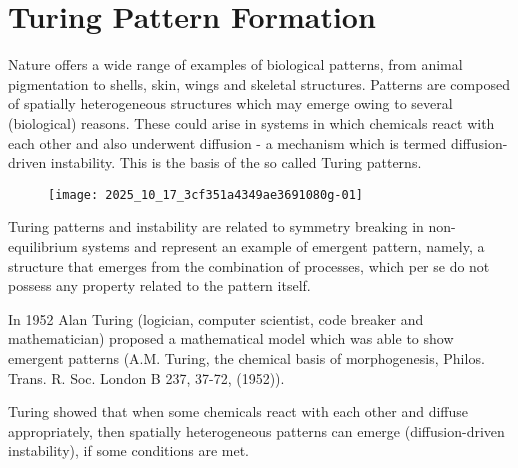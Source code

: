 
\section{Turing Pattern Formation}
Nature offers a wide range of examples of biological patterns, from animal pigmentation to shells, skin, wings and skeletal structures. Patterns are composed of spatially heterogeneous structures which may emerge owing to several (biological) reasons. These could arise in systems in which chemicals react with each other and also underwent diffusion - a mechanism which is termed diffusion-driven instability. This is the basis of the so called Turing patterns.
\begin{figure}[H]
    \centering
    \texttt{[image: 2025\_10\_17\_3cf351a4349ae3691080g-01]}
\end{figure}

Turing patterns and instability are related to symmetry breaking in non-equilibrium systems and represent an example of emergent pattern, namely, a structure that emerges from the combination of processes, which per se do not possess any property related to the pattern itself.

In 1952 Alan Turing (logician, computer scientist, code breaker and mathematician) proposed a mathematical model which was able to show emergent patterns (A.M. Turing, the chemical basis of morphogenesis, Philos. Trans. R. Soc. London B 237, 37-72, (1952)).

Turing showed that when some chemicals react with each other and diffuse appropriately, then spatially heterogeneous patterns can emerge (diffusion-driven instability), if some conditions are met.

